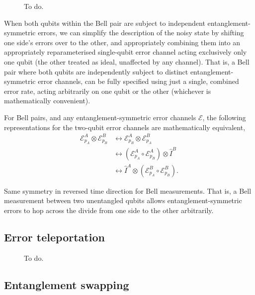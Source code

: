 \documentclass[aps,pra,twocolumn,amsmath,amssymb,nofootinbib,superscriptaddress]{revtex4}
\begin{document}
\begin{figure}
\caption{To do.}\label{fig:error_symmetry}	
\end{figure}

When both qubits within the Bell pair are subject to independent entanglement-symmetric errors, we can simplify the description of the noisy state by shifting one side's errors over to the other, and appropriately combining them into an appropriately reparameterised single-qubit error channel acting exclusively only one qubit (the other treated as ideal, unaffected by any channel). That is, a Bell pair where both qubits are independently subject to distinct entanglement-symmetric error channels, can be fully specified using just a single, combined error rate, acting arbitrarily on one qubit or the other (whichever is mathematically convenient).

For Bell pairs, and any entanglement-symmetric error channels $\mathcal{E}$, the following representations for the two-qubit error channels are mathematically equivalent,
\begin{align}
	\mathcal{E}^A_{p_A}\otimes \mathcal{E}^B_{p_B} &\longleftrightarrow \mathcal{E}^A_{p_B}\otimes \mathcal{E}^B_{p_A} \nonumber\\
	&\longleftrightarrow (\mathcal{E}^A_{p_A}\circ \mathcal{E}^A_{p_B})\otimes \hat{I}^B \nonumber\\
&\longleftrightarrow \hat{I}^A\otimes (\mathcal{E}^B_{p_A}\circ \mathcal{E}^B_{p_B}).
\end{align}

Same symmetry in reversed time direction for Bell measurements. That is, a Bell measurement between two unentangled qubits allows entanglement-symmetric errors to hop across the divide from one side to the other arbitrarily.

\subsection{Error teleportation}

\begin{figure}
\caption{To do.}\label{fig:error_teleport}	
\end{figure}

\subsection{Entanglement swapping}
\end{document}
